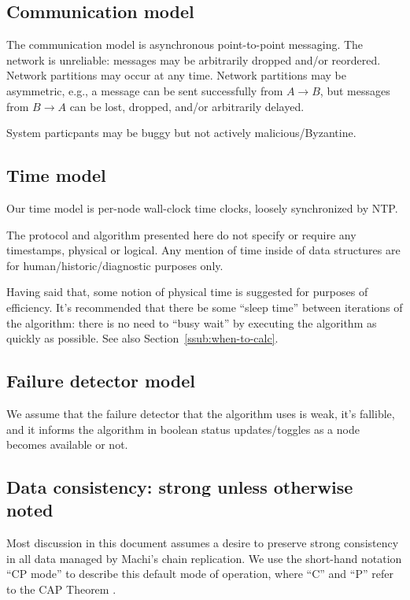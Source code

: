 \documentclass[preprint,10pt]{sigplanconf}
\begin{document}
\subsection{Communication model}

The communication model is asynchronous point-to-point messaging.
The network is unreliable: messages may be arbitrarily dropped and/or
reordered.  Network partitions may occur at any time.
Network partitions may be asymmetric, e.g., a message can be sent successfully
from $A \rightarrow B$, but messages from $B \rightarrow A$ can be
lost, dropped, and/or arbitrarily delayed.

System particpants may be buggy but not actively malicious/Byzantine.

\subsection{Time model}
\label{sub:time-model}

Our time model is per-node wall-clock time clocks, loosely
synchronized by NTP.

The protocol and algorithm presented here do not specify or require any
timestamps, physical or logical.  Any mention of time inside of data
structures are for human/historic/diagnostic purposes only.

Having said that, some notion of physical time is suggested for
purposes of efficiency.  It's recommended that there be some ``sleep
time'' between iterations of the algorithm: there is no need to ``busy
wait'' by executing the algorithm as quickly as possible.  See also
Section~\ref{ssub:when-to-calc}.

\subsection{Failure detector model}

We assume that the failure detector that the algorithm uses is weak,
it's fallible, and it informs the algorithm in boolean status
updates/toggles as a node becomes available or not.

\subsection{Data consistency: strong unless otherwise noted}

Most discussion in this document assumes a desire to preserve strong
consistency in all data managed by Machi's chain replication.  We
use the short-hand notation ``CP mode'' to describe this default mode
of operation, where ``C'' and ``P'' refer to the CAP Theorem
\cite{cap-theorem}.
\end{document}
